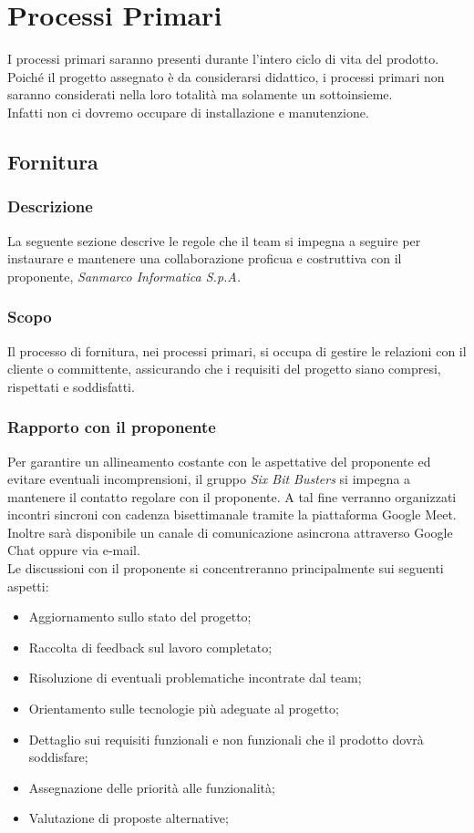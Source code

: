 \section{Processi Primari}
I processi primari saranno presenti durante l'intero ciclo di vita del
prodotto. Poiché il progetto assegnato è da considerarsi didattico, i processi
primari non saranno considerati nella loro totalità ma solamente un
sottoinsieme.\\ Infatti non ci dovremo occupare di installazione e
manutenzione.

\subsection{Fornitura}
\subsubsection{Descrizione}
La seguente sezione descrive le regole che il team si impegna a seguire per
instaurare e mantenere una collaborazione proficua e costruttiva con il
proponente, \textit{Sanmarco Informatica S.p.A.}

\subsubsection{Scopo}
Il processo di fornitura, nei processi primari, si occupa di gestire le
relazioni con il cliente o committente, assicurando che i requisiti del
progetto siano compresi, rispettati e soddisfatti.

\subsubsection{Rapporto con il proponente}
Per garantire un allineamento costante con le aspettative del proponente ed
evitare eventuali incomprensioni, il gruppo \textit{Six Bit Busters} si impegna
a mantenere il contatto regolare con il proponente. A tal fine verranno
organizzati incontri sincroni con cadenza bisettimanale tramite la piattaforma
Google Meet. Inoltre sarà disponibile un canale di comunicazione asincrona
attraverso Google Chat oppure via e-mail.\\

Le discussioni con il proponente si concentreranno principalmente sui seguenti
aspetti:

\begin{itemize}
    \item Aggiornamento sullo stato del progetto;
    \item Raccolta di feedback sul lavoro completato;
    \item Risoluzione di eventuali problematiche incontrate dal team;
    \item Orientamento sulle tecnologie più adeguate al progetto;
    \item Dettaglio sui requisiti funzionali e non funzionali che il prodotto dovrà
          soddisfare;
    \item Assegnazione delle priorità alle funzionalità;
    \item Valutazione di proposte alternative;
\end{itemize}

